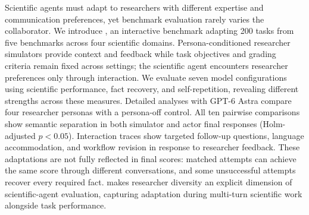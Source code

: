 Scientific agents must adapt to researchers with different expertise and
communication preferences, yet benchmark evaluation rarely varies the
collaborator. We introduce \benchmark, an interactive benchmark adapting
200 tasks from five benchmarks across four scientific domains.
Persona-conditioned researcher simulators provide context and feedback
while task objectives and grading criteria remain fixed across settings;
the scientific agent encounters researcher preferences only through interaction.
We evaluate seven model configurations using scientific performance,
fact recovery, and self-repetition, revealing different strengths across
these measures. Detailed analyses with GPT-6 Astra compare four researcher
personas with a persona-off control. All ten pairwise comparisons show
semantic separation in both simulator and actor final responses
(Holm-adjusted $p<0.05$). Interaction traces show targeted follow-up
questions, language accommodation, and workflow revision in response to
researcher feedback. These adaptations are not fully reflected in final
scores: matched attempts can achieve the same score through different
conversations, and some unsuccessful attempts recover every required fact.
\benchmark makes researcher diversity an explicit dimension of
scientific-agent evaluation, capturing adaptation during multi-turn
scientific work alongside task performance.
